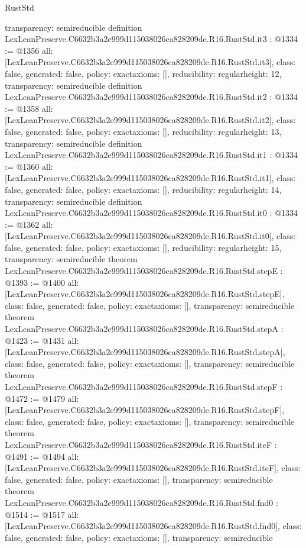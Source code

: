 \begin{lexlean}{RustStd}
\begin{coremodule}
{  transparency: semireducible
}
definition LexLeanPreserve.C6632b3a2e999d115038026ca828209de.R16.RustStd.it3 : @1334 := @1356 {
  all: [LexLeanPreserve.C6632b3a2e999d115038026ca828209de.R16.RustStd.it3],
  class: false,
  generated: false,
  policy: exact{axioms: []},
  reducibility: regular{height: 12},
  transparency: semireducible
}
definition LexLeanPreserve.C6632b3a2e999d115038026ca828209de.R16.RustStd.it2 : @1334 := @1358 {
  all: [LexLeanPreserve.C6632b3a2e999d115038026ca828209de.R16.RustStd.it2],
  class: false,
  generated: false,
  policy: exact{axioms: []},
  reducibility: regular{height: 13},
  transparency: semireducible
}
definition LexLeanPreserve.C6632b3a2e999d115038026ca828209de.R16.RustStd.it1 : @1334 := @1360 {
  all: [LexLeanPreserve.C6632b3a2e999d115038026ca828209de.R16.RustStd.it1],
  class: false,
  generated: false,
  policy: exact{axioms: []},
  reducibility: regular{height: 14},
  transparency: semireducible
}
definition LexLeanPreserve.C6632b3a2e999d115038026ca828209de.R16.RustStd.it0 : @1334 := @1362 {
  all: [LexLeanPreserve.C6632b3a2e999d115038026ca828209de.R16.RustStd.it0],
  class: false,
  generated: false,
  policy: exact{axioms: []},
  reducibility: regular{height: 15},
  transparency: semireducible
}
theorem LexLeanPreserve.C6632b3a2e999d115038026ca828209de.R16.RustStd.stepE : @1393 := @1400 {
  all: [LexLeanPreserve.C6632b3a2e999d115038026ca828209de.R16.RustStd.stepE],
  class: false,
  generated: false,
  policy: exact{axioms: []},
  transparency: semireducible
}
theorem LexLeanPreserve.C6632b3a2e999d115038026ca828209de.R16.RustStd.stepA : @1423 := @1431 {
  all: [LexLeanPreserve.C6632b3a2e999d115038026ca828209de.R16.RustStd.stepA],
  class: false,
  generated: false,
  policy: exact{axioms: []},
  transparency: semireducible
}
theorem LexLeanPreserve.C6632b3a2e999d115038026ca828209de.R16.RustStd.stepF : @1472 := @1479 {
  all: [LexLeanPreserve.C6632b3a2e999d115038026ca828209de.R16.RustStd.stepF],
  class: false,
  generated: false,
  policy: exact{axioms: []},
  transparency: semireducible
}
theorem LexLeanPreserve.C6632b3a2e999d115038026ca828209de.R16.RustStd.iteF : @1491 := @1494 {
  all: [LexLeanPreserve.C6632b3a2e999d115038026ca828209de.R16.RustStd.iteF],
  class: false,
  generated: false,
  policy: exact{axioms: []},
  transparency: semireducible
}
theorem LexLeanPreserve.C6632b3a2e999d115038026ca828209de.R16.RustStd.fnd0 : @1514 := @1517 {
  all: [LexLeanPreserve.C6632b3a2e999d115038026ca828209de.R16.RustStd.fnd0],
  class: false,
  generated: false,
  policy: exact{axioms: []},
  transparency: semireducible
}
\end{coremodule}
\end{lexlean}
